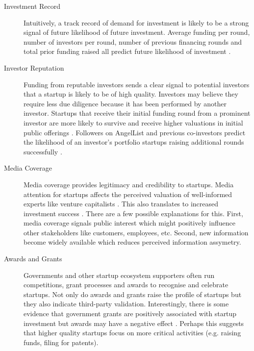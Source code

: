 \begin{description}

\item[Investment Record]

Intuitively, a track record of demand for investment is likely to be a strong signal of future likelihood of future investment. Average funding per round, number of investors per round, number of previous financing rounds and total prior funding raised all predict future likelihood of investment \cite{ahlers2015,beckwith2016,croce2016,hoenen2014,conti2013}.

\item[Investor Reputation]

Funding from reputable investors sends a clear signal to potential investors that a startup is likely to be of high quality. Investors may believe they require less due diligence because it has been performed by another investor. Startups that receive their initial funding round from a prominent investor are more likely to survive and receive higher valuations in initial public offerings \cite{hochberg2007}. Followers on AngelList and previous co-investors predict the likelihood of an investor's portfolio startups raising additional rounds successfully \cite{an2015,werth2013}.

\item[Media Coverage]

Media coverage provides legitimacy and credibility to startups. Media attention for startups affects the perceived valuation of well-informed experts like venture capitalists \cite{petkova2013}. This also translates to increased investment success \cite{beckwith2016}. There are a few possible explanations for this. First, media coverage signals public interest which might positively influence other stakeholders like customers, employees, etc. Second, new information become widely available which reduces perceived information assymetry.

\item[Awards and Grants]

Governments and other startup ecosystem supporters often run competitions, grant processes and awards to recognise and celebrate startups. Not only do awards and grants raise the profile of startups but they also indicate third-party validation. Interestingly, there is some evidence that government grants are positively associated with startup investment but awards may have a negative effect \cite{ahlers2015}. Perhaps this suggests that higher quality startups focus on more critical activities (e.g. raising funds, filing for patents).

\end{description}

